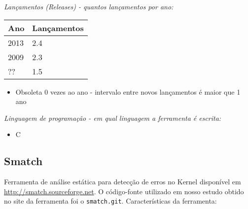\begin{description}

  \item {\it Lançamentos ({\it Releases}) - quantos lançamentos por ano:}
    \begin{table}[h!]
      \centering
      \begin{tabular}{| l | l |}
        \hline
        Ano  & Lançamentos \\
        \hline
        2013 & 2.4         \\
        2009 & 2.3         \\
        ??   & 1.5         \\
        \hline
      \end{tabular}
    \end{table}
    \begin{itemize}
      \item Obsoleta $0$ vezes ao ano - intervalo entre novos lançamentos é maior que 1 ano
    \end{itemize}

  \item {\it Linguagem de programação - em qual linguagem a ferramenta é escrita:}
    \begin{itemize}
      \item C
    \end{itemize}

\end{description}

\subsection{Smatch}

Ferramenta de análise estática para detecção de erros no Kernel disponível em
\url{http://smatch.sourceforge.net}. O código-fonte utilizado em nosso estudo
obtido no site da ferramenta foi o \texttt{smatch.git}. Características da
ferramenta:

